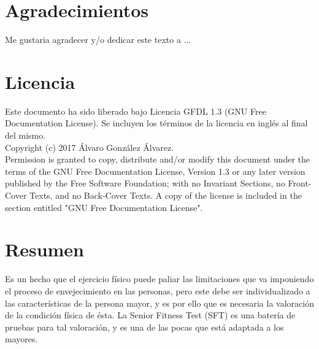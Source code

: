 

\section*{Agradecimientos}

Me gustaria agradecer y/o dedicar este texto a ...

\cleardoublepage

\section*{Licencia} %

Este documento ha sido liberado bajo Licencia GFDL 1.3 (GNU Free
Documentation License). Se incluyen los términos de la licencia en
inglés al final del mismo.\\

Copyright (c) 2017 Álvaro González Álvarez.\\

Permission is granted to copy, distribute and/or modify this document under the
terms of the GNU Free Documentation License, Version 1.3 or any later version
published by the Free Software Foundation; with no Invariant Sections, no
Front-Cover Texts, and no Back-Cover Texts. A copy of the license is included in
the section entitled "GNU Free Documentation License".\\

\cleardoublepage

\section*{Resumen}

Es un hecho que el ejercicio físico puede paliar las limitaciones que va imponiendo el proceso de envejecimiento en las personas, pero este debe ser individualizado a las características de la persona mayor, y es por ello que es necesaria la valoración de la condición física de ésta. La Senior Fitness Test (SFT) es una batería de pruebas para tal valoración, y es una de las pocas que está adaptada a los mayores.\\

